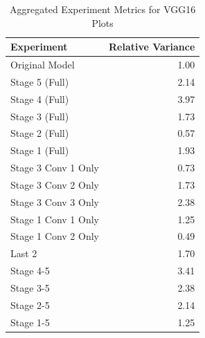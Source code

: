 \begin{table}
\caption{Aggregated Experiment Metrics for VGG16 Plots}
\label{tab:exp_plot_data_vgg16}
\begin{tabular}{lr}
\toprule
Experiment & Relative Variance \\
\midrule
Original Model & 1.00 \\
Stage 5 (Full) & 2.14 \\
Stage 4 (Full) & 3.97 \\
Stage 3 (Full) & 1.73 \\
Stage 2 (Full) & 0.57 \\
Stage 1 (Full) & 1.93 \\
Stage 3 Conv 1 Only & 0.73 \\
Stage 3 Conv 2 Only & 1.73 \\
Stage 3 Conv 3 Only & 2.38 \\
Stage 1 Conv 1 Only & 1.25 \\
Stage 1 Conv 2 Only & 0.49 \\
Last 2 & 1.70 \\
Stage 4-5 & 3.41 \\
Stage 3-5 & 2.38 \\
Stage 2-5 & 2.14 \\
Stage 1-5 & 1.25 \\
\bottomrule
\end{tabular}
\end{table}
